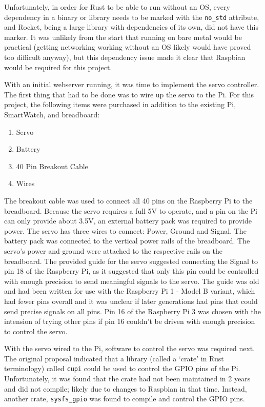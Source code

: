 \documentclass[a4paper]{article}
\begin{document}
Unfortunately, in order for Rust to be able to run without an OS, every dependency in a binary or library needs to be marked with the \texttt{no\_std} attribute, and Rocket, being a large library with dependencies of its own, did not have this marker.
It was unlikely from the start that running on bare metal would be practical (getting networking working without an OS likely would have proved too difficult anyway), but this dependency issue made it clear that Raspbian would be required for this project.


With an initial webserver running, it was time to implement the servo controller.
The first thing that had to be done was to wire up the servo to the Pi.
For this project, the following items were purchased in addition to the existing Pi, SmartWatch, and breadboard:
\begin{enumerate}
    \item Servo
    \item Battery
    \item 40 Pin Breakout Cable
    \item Wires
\end{enumerate}

The breakout cable was used to connect all 40 pins on the Raspberry Pi to the breadboard.
Because the servo requires a full 5V to operate, and a pin on the Pi can only provide about 3.5V, an external battery pack was required to provide power.
The servo has three wires to connect: Power, Ground and Signal.
The battery pack was connected to the vertical power rails of the breadboard.
The servo's power and ground were attached to the respective rails on the breadboard.
The provided guide for the servo suggested connecting the Signal to pin 18 of the Raspberry Pi, as it suggested that only this pin could be controlled with enough precision to send meaningful signals to the servo.
The guide was old and had been written for use with the Raspberry Pi 1 - Model B variant, which had fewer pins overall and it was unclear if later generations had pins that could send precise signals on all pins.
Pin 16 of the Raspberry Pi 3 was chosen with the intension of trying other pins if pin 16 couldn't be driven with enough precision to control the servo.


With the servo wired to the Pi, software to control the servo was required next.
The original proposal indicated that a library (called a `crate' in Rust terminology) called \texttt{cupi} could be used to control the GPIO pins of the Pi.
Unfortunately, it was found that the crate had not been maintained in 2 years and did not compile; likely due to changes to Raspbian in that time.
Instead, another crate, \texttt{sysfs\_gpio} was found to compile and control the GPIO pins.
\end{document}
